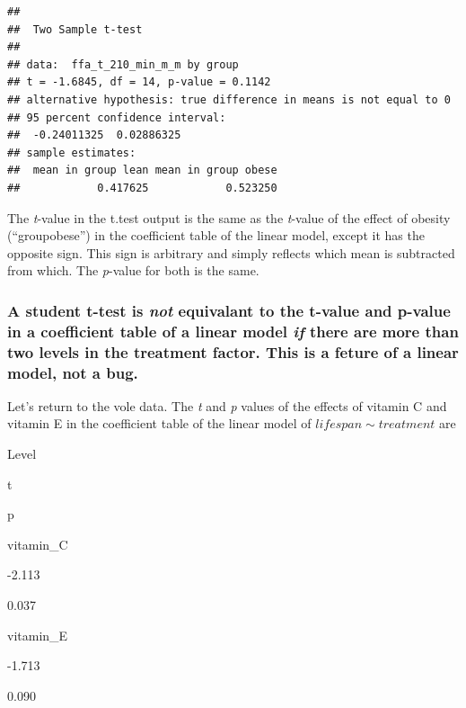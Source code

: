 \documentclass[]{book}
\begin{document}
\begin{verbatim}
## 
##  Two Sample t-test
## 
## data:  ffa_t_210_min_m_m by group
## t = -1.6845, df = 14, p-value = 0.1142
## alternative hypothesis: true difference in means is not equal to 0
## 95 percent confidence interval:
##  -0.24011325  0.02886325
## sample estimates:
##  mean in group lean mean in group obese 
##            0.417625            0.523250
\end{verbatim}

The \emph{t}-value in the t.test output is the same as the \emph{t}-value of the effect of obesity (``groupobese'') in the coefficient table of the linear model, except it has the opposite sign. This sign is arbitrary and simply reflects which mean is subtracted from which. The \emph{p}-value for both is the same.

\hypertarget{a-student-t-test-is-not-equivalant-to-the-t-value-and-p-value-in-a-coefficient-table-of-a-linear-model-if-there-are-more-than-two-levels-in-the-treatment-factor.-this-is-a-feture-of-a-linear-model-not-a-bug.}{%
\subsubsection{\texorpdfstring{A student t-test is \emph{not} equivalant to the t-value and p-value in a coefficient table of a linear model \emph{if} there are more than two levels in the treatment factor. This is a feture of a linear model, not a bug.}{A student t-test is not equivalant to the t-value and p-value in a coefficient table of a linear model if there are more than two levels in the treatment factor. This is a feture of a linear model, not a bug.}}\label{a-student-t-test-is-not-equivalant-to-the-t-value-and-p-value-in-a-coefficient-table-of-a-linear-model-if-there-are-more-than-two-levels-in-the-treatment-factor.-this-is-a-feture-of-a-linear-model-not-a-bug.}}

Let's return to the vole data. The \emph{t} and \emph{p} values of the effects of vitamin C and vitamin E in the coefficient table of the linear model of \(lifespan \sim treatment\) are

Level

t

p

vitamin\_C

-2.113

0.037

vitamin\_E

-1.713

0.090
\end{document}
